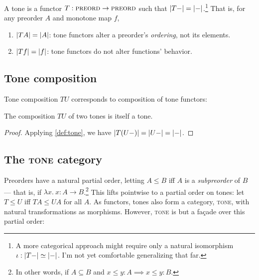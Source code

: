 \documentclass{rntz}
\newcommand{\fn}{\lambda}
\newcommand{\binder}{.~}
\newcommand{\bind}[1]{{#1}\binder}
\newcommand{\fnof}[1]{\fn\bind{#1}}
\newcommand{\cat}[1]{\textsc{#1}} %
\newcommand{\Pre}{\cat{preord}}
\newcommand{\Tone}{\cat{tone}}
\newcommand{\Cat}{\cat{cat}}
\newcommand\isoto{\simeq}
\begin{document}
\begin{definition}[Tones]\label{def:tone}
  A tone is a functor $T : \Pre \to \Pre$ such that $|{T-}| =
  |{-}|$.\footnote{A more categorical approach might require only a natural
    isomorphism \(\iota : \elems{T-} \isoto \elemsfn\). I'm not yet comfortable
    generalizing that far.} That is, for any preorder $A$ and monotone map $f$,
  \begin{enumerate}
  \item $|{TA}| = |{A}|$: tone functors alter a preorder's
    \emph{ordering}, not its elements.
  \item $|{Tf}| = |{f}|$: tone functors do not alter functions'
    behavior.
  \end{enumerate}
\end{definition}



\subsection{Tone composition}

Tone composition $TU$ corresponds to composition of tone functors:

\begin{theorem}
  The composition $TU$ of two tones is itself a tone.
\end{theorem}

\begin{proof} Applying \cref{def:tone}, we have
  \( |{T(U-)}| = |{U-}| = |{-}| \).
\end{proof}


\subsection{The \Tone{} category}

Preorders have a natural partial order, letting $A \le B$ iff $A$ is a
\emph{subpreorder} of $B$ --- that is, if $\fnof{x} x : A \to B$.\footnote{In
  other words, if $A \subseteq B$ and $x \le y : A \implies x \le y : B$.}
%
This lifts pointwise to a partial order on tones: let $T \le U$ iff
$TA \le UA$ for all $A$.
%
As functors, tones also form a category, \Tone{}, with natural transformations
as morphisms. However, \Tone{} is but a fa\c{c}ade over this partial order:
\end{document}
